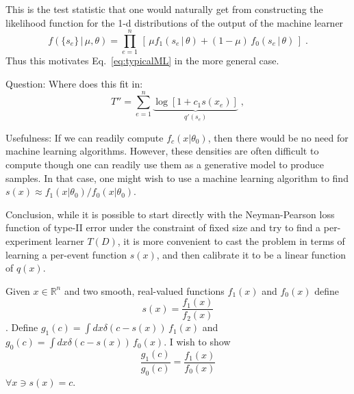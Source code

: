 \documentclass[11pt, oneside]{article}   	%
\begin{document}


This is the test statistic that one would naturally get from constructing the likelihood function for the 1-d distributions of the output of the machine learner
\begin{equation}\label{eq:NP}
f( \{s_e\} \,|\, \mu, \theta) = \prod_{e=1}^n \, \left[\, \mu f_1( s_e \, |\,  \theta)  + (1-\mu)\, f_0( s_e \,|\, \theta) \,\right] \; .
\end{equation}
Thus this motivates Eq.~\ref{eq:typicalML} in the more general case. 


Question:
Where does this fit in:
\begin{equation}
T'' = \sum_{e=1}^n \underbrace{ \log \left[ 1+c_1 s(x_e) \right] }_{q'(s_e)} \;,
\end{equation}



Usefulness:
If we can readily compute $f_c(x|\theta_0)$, then there would be no need for machine learning algorithms. However,  these densities are often difficult to compute though one can readily use them as a generative model to produce samples. In that case, one might wish to use a machine learning algorithm to find $s(x) \approx f_1(x|\theta_0) / f_0(x|\theta_0)$. 

Conclusion, while it is possible to start directly with the Neyman-Pearson loss function of type-II error under the constraint of fixed size and try to find a per-experiment learner $T(D)$, it is more convenient to cast the problem in terms of learning a per-event function $s(x)$, and then calibrate it to be a linear function of $q(x)$.

\newpage

Given $x\in \mathbb{R}^n$ and two smooth, real-valued functions $f_1(x)$ and $f_0(x)$ define 
\begin{equation} 
s(x)=\frac{f_1(x)}{f_2(x)}
\end{equation}.
Define $g_1(c) = \int dx \delta(c - s(x) ) \, f_1(x)$ and $g_0(c) = \int dx \delta(c - s(x) ) \, f_0(x)$.
I wish to show
\begin{equation}
\frac{g_1(c)}{g_0(c)} = \frac{f_1(x)}{f_0(x)}
\end{equation}
$\forall x \ni s(x)=c$.
\end{document}
